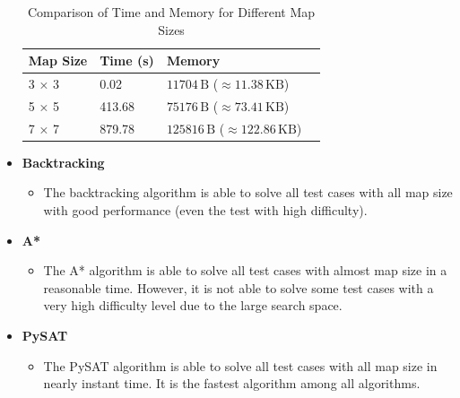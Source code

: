 \begin{flushleft}
\begin{itemize}
\begin{flushleft}
                  \begin{table}[ht]
                      \centering
                      \begin{tabular}{|l|l|l|l|}
                          \hline
                          \textbf{Map Size} & \textbf{Time (s)} & \textbf{Memory}                                         \\
                          \hline
                          3 × 3             & 0.02              & \( 11704 \, \text{B} \) (\( \approx 11.38 \, \text{KB} \))   \\
                          \hline
                          5 × 5             & 413.68            & \( 75176 \, \text{B} \) (\( \approx 73.41 \, \text{KB} \))   \\
                          \hline
                          7 × 7             & 879.78            & \( 125816 \, \text{B} \) (\( \approx 122.86 \, \text{KB} \)) \\
                          \hline
                      \end{tabular}
                      \caption{Comparison of Time and Memory for Different Map Sizes}
                  \end{table}
              \end{flushleft}
        \item \textbf{Backtracking}
              \begin{itemize}
                  \item The backtracking algorithm is able to solve all test cases with all map size with good performance (even the test with high difficulty).
              \end{itemize}
        \item \textbf{A*}
              \begin{itemize}
                  \item The A* algorithm is able to solve all test cases with almost map size in a reasonable time. However, it is not able to solve some test cases with a very high difficulty level due to the large search space.
              \end{itemize}
        \item \textbf{PySAT}
              \begin{itemize}
                  \item The PySAT algorithm is able to solve all test cases with all map size in nearly instant time. It is the fastest algorithm among all algorithms.
              \end{itemize}
    \end{itemize}
\end{flushleft}

